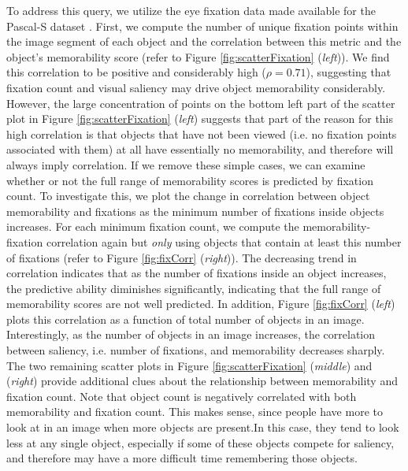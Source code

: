 To address this query, we utilize the eye fixation data made available for the Pascal-S dataset \cite{yin14}. First, we compute the number of unique fixation points within the image segment of each object and the correlation between this metric and the object’s memorability score (refer to Figure \ref{fig:scatterFixation} (\emph{left})). We find this correlation to be positive and considerably high ($\rho = 0.71$), suggesting that fixation count and visual saliency may drive object memorability considerably. However, the large concentration of points on the bottom left part of the scatter plot in Figure \ref{fig:scatterFixation} (\emph{left}) suggests that part of the reason for this high correlation is that objects that have not been viewed (i.e. no fixation points associated with them) at all have essentially no memorability, and therefore will always imply correlation. If we remove these simple cases, we can examine whether or not the full range of memorability scores is predicted by fixation count. To investigate this, we plot the change in correlation between object memorability and fixations as the minimum number of fixations inside objects increases. For each minimum fixation count, we compute the memorability-fixation correlation again but \emph{only} using objects that contain at least this number of fixations (refer to Figure \ref{fig:fixCorr} (\emph{right})). The decreasing trend in correlation indicates that as the number of fixations inside an object increases, the predictive ability diminishes significantly, indicating that the full range of memorability scores are not well predicted. In addition, Figure \ref{fig:fixCorr} (\emph{left}) plots this correlation as a function of total number of objects in an image. Interestingly, as the number of objects in an image increases, the correlation between saliency, i.e. number of fixations, and memorability decreases sharply.
The two remaining scatter plots in Figure \ref{fig:scatterFixation} (\emph{middle}) and (\emph{right}) provide additional clues about the relationship between memorability and fixation count. Note that object count is negatively correlated with both memorability and fixation count. This makes sense, since people have more to look at in an image when more objects are present.In this case, they tend to look less at any single object, especially if some of these objects compete for saliency, and therefore may have a more difficult time remembering those objects.



